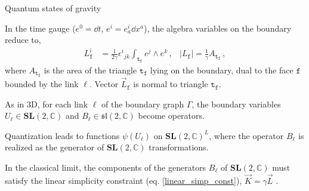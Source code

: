\documentclass[12pt,titlepage]{article}
\begin{document}

\begin{frame}{Quantum states of gravity}
    \begin{list}{\,}{\leftmargin=1em \itemindent=0em}
        \item<1-> In the time gauge ($e^0=\dd{t}$, $e^i=e^i_a\dd{x^a}$), the algebra variables on the boundary reduce to,
        \begin{align}
            L^i_\mathtt{f}&=\frac{1}{2\gamma}{\epsilon^{i}}_{jk}\int_{\mathtt{t_\mathtt{f}}}e^j\wedge e^k\,, & \lvert L_\mathtt{f} \rvert =\frac{1}{\gamma} A_{\mathtt{t_\mathtt{f}}}\,,
        \end{align}
        where $A_{\mathtt{t_\mathtt{f}}}$ is the area of the triangle $\mathtt{t_\mathtt{f}}$ lying on the boundary, dual to the face $\mathtt{f}$ bounded by the link $\ell$. Vector $\vec{L}_\mathtt{f}$ is normal to triangle $\mathtt{t_\mathtt{f}}$.
        \item<2-> As in 3D, for each link $\ell$ of the boundary graph $\Gamma$, the boundary variables $U_\ell\in\mathbf{SL}(2,\mathbb{C})$ and $B_\ell\in\mathfrak{sl}(2,\mathbb{C})$ become operators.
        \item<3-> Quantization leads to functions $\psi(U_\ell)$ on ${\mathbf{SL}(2,\mathbb{C})}^L$, where the operator $B_\ell$ is realized as the generator of $\mathbf{SL}(2,\mathbb{C})$ transformations.
        \item<4-> In the classical limit, the components of the generators $B_\ell$ of $\mathbf{SL}(2,\mathbb{C})$ must satisfy the linear simplicity constraint (eq. \ref{linear_simp_const}), $\vec{K}=\gamma\vec{L}$ .
    \end{list}
\end{frame}
\end{document}

